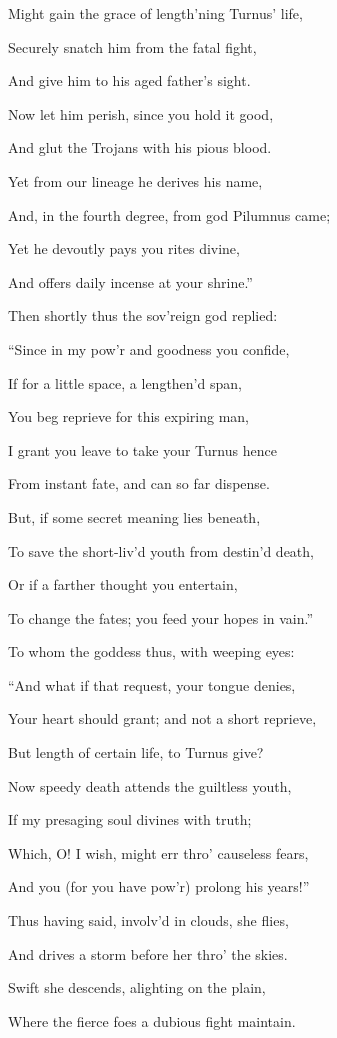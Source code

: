 Might gain the grace of length’ning Turnus’ life,

Securely snatch him from the fatal fight,

And give him to his aged father’s sight.

Now let him perish, since you hold it good,

And glut the Trojans with his pious blood.

Yet from our lineage he derives his name,

And, in the fourth degree, from god Pilumnus came;

Yet he devoutly pays you rites divine,

And offers daily incense at your shrine.”

Then shortly thus the sov’reign god replied:

“Since in my pow’r and goodness you confide,

If for a little space, a lengthen’d span,

You beg reprieve for this expiring man,

I grant you leave to take your Turnus hence

From instant fate, and can so far dispense.

But, if some secret meaning lies beneath,

To save the short-liv’d youth from destin’d death,

Or if a farther thought you entertain,

To change the fates; you feed your hopes in vain.”

To whom the goddess thus, with weeping eyes:

“And what if that request, your tongue denies,

Your heart should grant; and not a short reprieve,

But length of certain life, to Turnus give?

Now speedy death attends the guiltless youth,

If my presaging soul divines with truth;

Which, O! I wish, might err thro’ causeless fears,

And you (for you have pow’r) prolong his years!”

Thus having said, involv’d in clouds, she flies,

And drives a storm before her thro’ the skies.

Swift she descends, alighting on the plain,

Where the fierce foes a dubious fight maintain.

